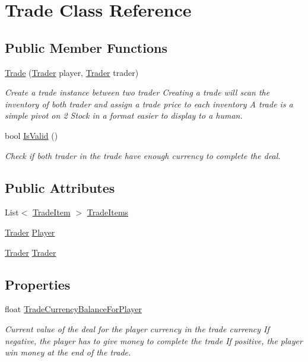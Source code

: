 \hypertarget{class_trade}{}\section{Trade Class Reference}
\label{class_trade}
\subsection*{Public Member Functions}
\begin{DoxyCompactItemize}
\item 
\hyperlink{class_trade_a6c33a0460eeb227454ca5796694ca377}{Trade} (\hyperlink{class_trader}{Trader} player, \hyperlink{class_trader}{Trader} trader)
\begin{DoxyCompactList}\small\item\em Create a trade instance between two trader Creating a trade will scan the inventory of both trader and assign a trade price to each inventory A trade is a simple pivot on 2 Stock in a format easier to display to a human. \end{DoxyCompactList}\item 
bool \hyperlink{class_trade_aecd1f04d634f477fa7325a618d33a066}{Is\+Valid} ()
\begin{DoxyCompactList}\small\item\em Check if both trader in the trade have enough currency to complete the deal. \end{DoxyCompactList}\end{DoxyCompactItemize}
\subsection*{Public Attributes}
\begin{DoxyCompactItemize}
\item 
List$<$ \hyperlink{class_trade_item}{Trade\+Item} $>$ \hyperlink{class_trade_acc717b21584feecc94ecec3193063978}{Trade\+Items}
\item 
\hyperlink{class_trader}{Trader} \hyperlink{class_trade_aa0a7026f96034e12f9e5f091fecc0f7a}{Player}
\item 
\hyperlink{class_trader}{Trader} \hyperlink{class_trade_af15be18bc46b24eb2e8dd2b434f324ad}{Trader}
\end{DoxyCompactItemize}
\subsection*{Properties}
\begin{DoxyCompactItemize}
\item 
float \hyperlink{class_trade_aaba340cfdb727fe90d16a43fb3ebe3ae}{Trade\+Currency\+Balance\+For\+Player}
\begin{DoxyCompactList}\small\item\em Current value of the deal for the player currency in the trade currency If negative, the player has to give money to complete the trade If positive, the player win money at the end of the trade. \end{DoxyCompactList}\end{DoxyCompactItemize}


